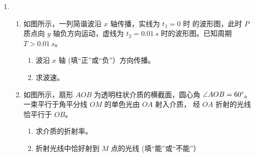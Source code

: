 \begin{enumerate}
\begin{enumerate}
	
\end{enumerate}



\item 
{}
\begin{enumerate}
	\item
如图所示，一列简谐波沿 $ x $ 轴传播，实线为 $ t_{1} =0 $ 时
的波形图，此时 $ P $ 质点向 $ y $ 轴负方向运动，虚线为
$ t_{2} =0.01 \ s $ 时的波形图。已知周期 $ T>0.01 \ s $。
\begin{enumerate}
	\item
波沿 $ x $ 轴 \underlinegap (填“正”或“负”）方向传播。
\item 
求波速。
\end{enumerate}
\begin{figure}[h!]
	\flushright
	
\end{figure}





\item 
如图所示，扇形 $ AOB $ 为透明柱状介质的横截面，圆心角
$ \angle AOB=60 \degree $。一束平行于角平分线 $ OM $ 的单色光由 $ OA $ 射入介质，
经 $ OA $ 折射的光线恰平行于 $ OB $。
\begin{enumerate}
	\item
求介质的折射率。
\item 
折射光线中恰好射到 $ M $ 点的光线 \underlinegap (填“能”或“不能”）


\end{enumerate}
\end{enumerate}
\end{enumerate}
